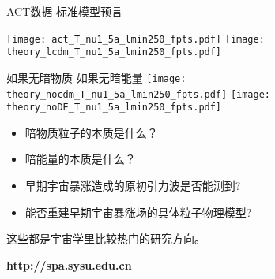 \documentclass[CJK]{beamer}
\begin{document}
\begin{frame}
\bch
\hskip 0.2in ACT数据 \hskip 0.6in   标准模型预言

\texttt{[image: act\_T\_nu1\_5a\_lmin250\_fpts.pdf]}
\texttt{[image: theory\_lcdm\_T\_nu1\_5a\_lmin250\_fpts.pdf]}

如果无暗物质 \hskip 0.5in 如果无暗能量
\texttt{[image: theory\_nocdm\_T\_nu1\_5a\_lmin250\_fpts.pdf]}
\texttt{[image: theory\_noDE\_T\_nu1\_5a\_lmin250\_fpts.pdf]}

\ech
\end{frame}

\begin{frame}
\bch
\begin{itemize}
\item{暗物质粒子的本质是什么？}
\item{暗能量的本质是什么？}
\item{早期宇宙暴涨造成的原初引力波是否能测到?}
\item{能否重建早期宇宙暴涨场的具体粒子物理模型?}
\end{itemize}

这些都是宇宙学里比较热门的研究方向。
\ech
\end{frame}
\begin{frame}
\bch
\centering


{\large \bf http://spa.sysu.edu.cn}

\ech
\end{frame}
\end{document}
